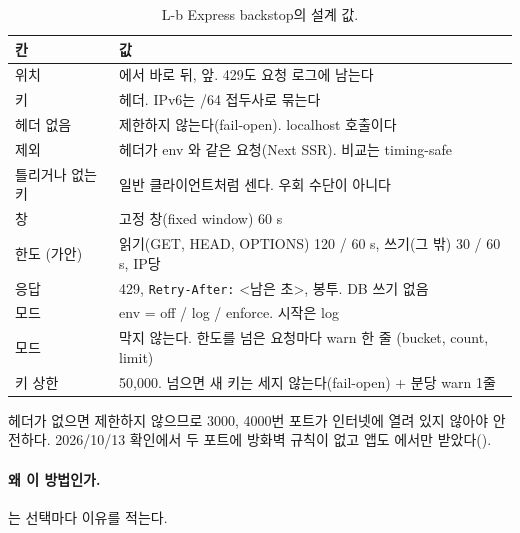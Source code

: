 \begin{table}[H]
  \caption{L-b Express backstop의 설계 값.}
  \label{tab:bl-lb}
  \centering\footnotesize
  \begin{tabularx}{\linewidth}{@{}L{3.0cm}Y@{}}
    \toprule
    칸 & 값 \\
    \midrule
    위치 & 에서  바로 뒤,  앞. 429도 요청 로그에 남는다 \\
    \midrule
    키 &  헤더. IPv6는 /64 접두사로 묶는다 \\
    \midrule
    헤더 없음 & 제한하지 않는다(fail-open). localhost 호출이다 \\
    \midrule
    제외 &  헤더가 env 와 같은 요청(Next SSR). 비교는 timing-safe \\
    \midrule
    틀리거나 없는 키 & 일반 클라이언트처럼 센다. 우회 수단이 아니다 \\
    \midrule
    창 & 고정 창(fixed window) 60 s \\
    \midrule
    한도 (가안) & 읽기(GET, HEAD, OPTIONS) 120 / 60 s, 쓰기(그 밖) 30 / 60 s, IP당 \\
    \midrule
    응답 & 429, \texttt{Retry-After:} <남은 초>,  봉투. DB 쓰기 없음 \\
    \midrule
    모드 & env  = off / log / enforce. 시작은 log \\
    \midrule
     모드 & 막지 않는다. 한도를 넘은 요청마다 warn 한 줄  (bucket, count, limit) \\
    \midrule
    키 상한 & 50,000. 넘으면 새 키는 세지 않는다(fail-open) + 분당 warn 1줄 \\
    \bottomrule
  \end{tabularx}
\end{table}

\begin{callout}
헤더가 없으면 제한하지 않으므로 3000, 4000번 포트가 인터넷에 열려 있지 않아야 안전하다.
2026/10/13 확인에서 두 포트에 방화벽 규칙이 없고 앱도 에서만 받았다().
\end{callout}

\paragraph{왜 이 방법인가.}
는 선택마다 이유를 적는다.

